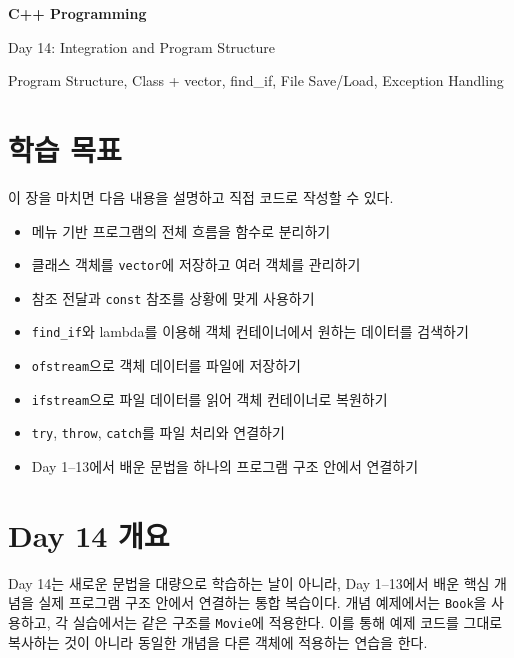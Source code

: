 \documentclass[11pt,a4paper]{article}
\begin{document}
\begin{titlepage}
    \centering
    \vspace*{3cm}
    {\Huge\bfseries C++ Programming\par}
    \vspace{0.8cm}
    {\LARGE Day 14: Integration and Program Structure\par}
    \vspace{2cm}
    {\large Program Structure, Class + vector, find\_if, File Save/Load, Exception Handling\par}
    \vfill
\end{titlepage}

\tableofcontents
\newpage

\section{학습 목표}
\begin{learningbox}
이 장을 마치면 다음 내용을 설명하고 직접 코드로 작성할 수 있다.
\begin{itemize}[leftmargin=1.5em]
    \item 메뉴 기반 프로그램의 전체 흐름을 함수로 분리하기
    \item 클래스 객체를 \texttt{vector}에 저장하고 여러 객체를 관리하기
    \item 참조 전달과 \texttt{const} 참조를 상황에 맞게 사용하기
    \item \texttt{find\_if}와 lambda를 이용해 객체 컨테이너에서 원하는 데이터를 검색하기
    \item \texttt{ofstream}으로 객체 데이터를 파일에 저장하기
    \item \texttt{ifstream}으로 파일 데이터를 읽어 객체 컨테이너로 복원하기
    \item \texttt{try}, \texttt{throw}, \texttt{catch}를 파일 처리와 연결하기
    \item Day 1--13에서 배운 문법을 하나의 프로그램 구조 안에서 연결하기
\end{itemize}
\end{learningbox}

\section{Day 14 개요}
Day 14는 새로운 문법을 대량으로 학습하는 날이 아니라,
Day 1--13에서 배운 핵심 개념을 실제 프로그램 구조 안에서 연결하는 통합 복습이다.
개념 예제에서는 \texttt{Book}을 사용하고, 각 실습에서는 같은 구조를 \texttt{Movie}에 적용한다.
이를 통해 예제 코드를 그대로 복사하는 것이 아니라 동일한 개념을 다른 객체에 적용하는 연습을 한다.
\end{document}
